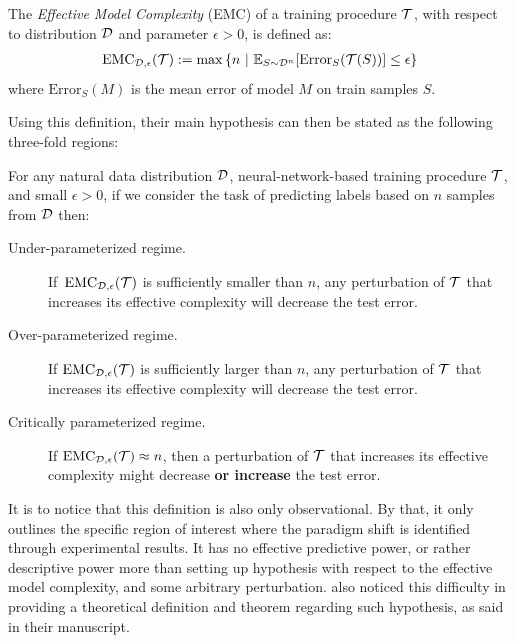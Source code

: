 \documentclass[10pt,oneside,oldfontcommands,dvipsnames,article]{memoir}
\begin{document}
\newcommand{\EMC}{\mathrm{EMC}}
\begin{definition}
The \emph{Effective Model Complexity} (EMC) of a training procedure $\mathcal{T}$, with respect to distribution $\mathcal{D}$ and parameter $\epsilon>0$,
is defined as:
\begin{align*}
    \EMC_{\cD,\eps}(\cT)
    :=  \max \left\{n ~|~ \E_{S \sim \cD^n}[ \mathrm{Error}_S( \cT( S )  ) ] \leq \eps \right\}
    \end{align*}
    where $\mathrm{Error}_S(M)$ is the mean error of model $M$ on train samples $S$.
\end{definition}

Using this definition, their main hypothesis can then be stated as the following three-fold regions:

\begin{hypothesis} \label{hyp:informaldd}
For any natural data distribution $\mathcal{D}$, neural-network-based training procedure $\mathcal{T}$, and small $\epsilon>0$,
if we consider the task of predicting labels based on  $n$ samples from $\mathcal{D}$ then:
\begin{description}
    \item[Under-parameterized regime.]  If~$\EMC_{\cD,\epsilon}(\cT)$ is sufficiently smaller than $n$, any perturbation of $\mathcal{T}$ that increases its effective complexity will decrease the test error.
    \item[Over-parameterized regime.] If $\EMC_{\cD,\epsilon}(\cT)$ is sufficiently larger than $n$,
    any perturbation of $\mathcal{T}$ that increases its effective complexity will decrease the test error.
    
    \item[Critically parameterized regime.] If $\EMC_{\cD,\epsilon}(\cT) \approx n$, then
    a perturbation of $\mathcal{T}$ that increases its effective complexity
    might decrease {\bf or increase} the test error.
\end{description}
\end{hypothesis}

It is to notice that this definition is also only observational. By that, it only outlines the specific region of interest where the paradigm shift is identified through experimental results. It has no effective predictive power, or rather descriptive power more than setting up hypothesis with respect to the effective model complexity, and some arbitrary perturbation. \cite{nakkiran_deep_2019} also noticed this difficulty in providing a theoretical definition and theorem regarding such hypothesis, as said in their manuscript. 
\end{document}
